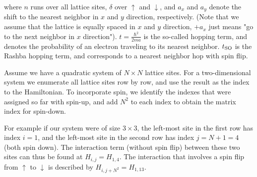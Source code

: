 \documentclass[11pt]{report}
\newcommand{\tso}{\ensuremath{t_{\textnormal{SO}}}}
\begin{document}
where $n$ runs over all lattice sites, $\delta$ over $\uparrow$ and
$\downarrow$, and $a_x$ and $a_y$ denote the shift to the nearest neighbor in
$x$ and $y$ direction, respectively. (Note that we assume that the lattice is
equally spaced in $x$ and $y$ direction, $+a_x$ just means "go to the next
neighbor in $x$ direction"). $t = \frac{\hbar^2}{2ma}$ is the so-called hopping term, and denotes the
probability of an electron traveling to its nearest neighbor. $\tso$ is the
Rashba hopping term, and corresponds to a nearest neighbor hop with spin
flip.

Assume we have a quadratic system of $N \times N$ lattice sites.
For a two-dimensional system we enumerate all lattice sites row by row, and
use the result as the index to the Hamiltonian. To incorporate spin, we
identify the indexes that were assigned so far with spin-up, and add $N^2$ to
each index to obtain the matrix index for spin-down.

For example if our system were of size $3 \times 3$, the left-most site in the
first row has index $i = 1$, and the left-most site in the second row has
index $j = N + 1 = 4$ (both spin down). The interaction term (without spin
flip) between these two sites can thus be found at $H_{i,j} = H_{1,4}$. The
interaction that involves a spin flip from $\uparrow$ to $\downarrow$ is
described by $H_{i, j+N^2} = H_{1, 13}$.
\end{document}
